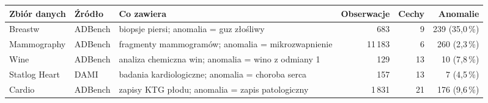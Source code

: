 \begin{tabular}{llL{5.2cm}rrr}
\toprule
Zbiór danych & Źródło & Co zawiera & Obserwacje & Cechy & Anomalie \\
\midrule
Breastw & ADBench & biopsje piersi; anomalia = guz złośliwy & 683 & 9 & 239 (35,0\,\%) \\
Mammography & ADBench & fragmenty mammogramów; anomalia = mikrozwapnienie & 11\,183 & 6 & 260 (2,3\,\%) \\
Wine & ADBench & analiza chemiczna win; anomalia = wino z odmiany 1 & 129 & 13 & 10 (7,8\,\%) \\
Statlog Heart & DAMI & badania kardiologiczne; anomalia = choroba serca & 157 & 13 & 7 (4,5\,\%) \\
Cardio & ADBench & zapisy KTG płodu; anomalia = zapis patologiczny & 1\,831 & 21 & 176 (9,6\,\%) \\
\bottomrule
\end{tabular}
